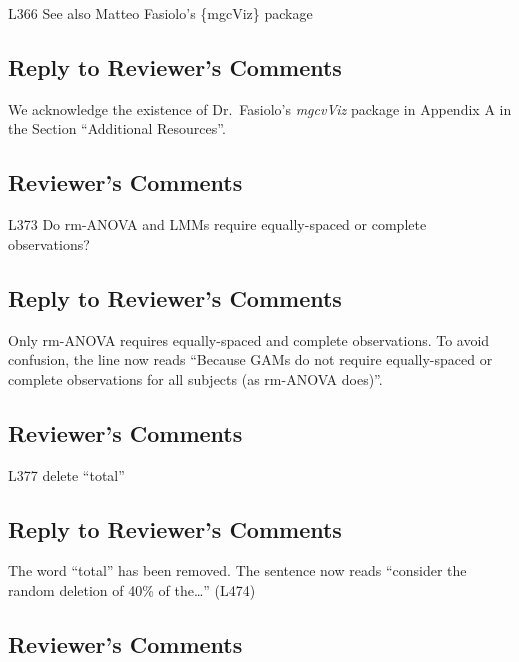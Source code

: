 \documentclass[
]{article}
\begin{document}
L366 See also Matteo Fasiolo's \{mgcViz\} package

\hypertarget{section-31}{%
\subsection{\texorpdfstring{\textcolor{reviewersblue} {Reply to Reviewer's Comments}}{}}\label{section-31}}

We acknowledge the existence of Dr.~Fasiolo's \emph{mgcvViz} package in Appendix A in the Section ``Additional Resources''.

\hypertarget{reviewers-comments-31}{%
\subsection{Reviewer's Comments}\label{reviewers-comments-31}}

L373 Do rm-ANOVA and LMMs require equally-spaced or complete observations?

\hypertarget{section-32}{%
\subsection{\texorpdfstring{\textcolor{reviewersblue} {Reply to Reviewer's Comments}}{}}\label{section-32}}

Only rm-ANOVA requires equally-spaced and complete observations. To avoid confusion, the line now reads ``Because GAMs do not require equally-spaced or complete observations for all subjects (as rm-ANOVA does)''.

\hypertarget{reviewers-comments-32}{%
\subsection{Reviewer's Comments}\label{reviewers-comments-32}}

L377 delete ``total''

\hypertarget{section-33}{%
\subsection{\texorpdfstring{\textcolor{reviewersblue} {Reply to Reviewer's Comments}}{}}\label{section-33}}

The word ``total'' has been removed. The sentence now reads ``consider the random deletion of 40\% of the\ldots{}'' (L474)

\hypertarget{reviewers-comments-33}{%
\subsection{Reviewer's Comments}\label{reviewers-comments-33}}
\end{document}
